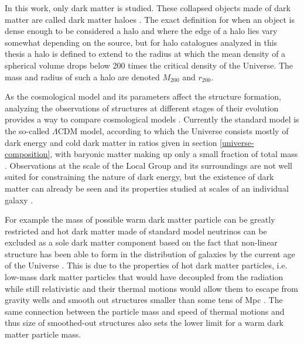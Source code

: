 \documentclass[english, oneside]{HYgradu}
\begin{document}
In this work, only dark matter is studied. These collapsed objects made of dark matter are called dark matter haloes \citep{mo2010galaxy}. The exact definition for when an object is dense enough to be considered a halo and where the edge of a halo lies vary somewhat depending on the source, but for halo catalogues analyzed in this thesis a halo is defined to extend to the radius at which the mean density of a spherical volume drops below 200 times the critical density of the Universe. The mass and radius of such a halo are denoted $M_{200}$ and $r_{200}$.

As the cosmological model and its parameters affect the structure formation, analyzing the observations of structures at different stages of their evolution provides a way to compare cosmological models \citep{mo2010galaxy}. Currently the standard model is the so-called $\Lambda$CDM model, according to which the Universe consists mostly of dark energy and cold dark matter in ratios given in section \ref{universe-composition}, with baryonic matter making up only a small fraction of total mass \citep{mo2010galaxy}. Observations at the scale of the Local Group and its surroundings are not well suited for constraining the nature of dark energy, but the existence of dark matter can already be seen and its properties studied at scales of an individual galaxy \citep{mo2010galaxy}.

For example the mass of possible warm dark matter particle can be greatly restricted \citep{kennedy2014constraining} and hot dark matter made of standard model neutrinos can be excluded as a sole dark matter component based on the fact that non-linear structure has been able to form in the distribution of galaxies by the current age of the Universe \citep{white1984is}. This is due to the properties of hot dark matter particles, i.e. low-mass dark matter particles that would have decoupled from the radiation while still relativistic  and their thermal motions would allow them to escape from gravity wells and smooth out structures smaller than some tens of Mpc \citep{mo2010galaxy}. The same connection between the particle mass and speed of thermal motions and thus size of smoothed-out structures also sets the lower limit for a warm dark matter particle mass.


\end{document}
